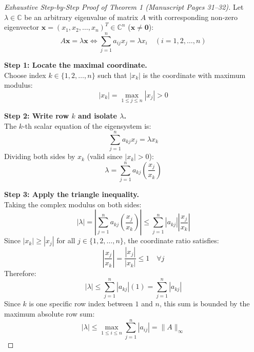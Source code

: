\begin{proof}[Exhaustive Step-by-Step Proof of Theorem 1 (Manuscript Pages 31--32)]
Let $\lambda \in \mathbb{C}$ be an arbitrary eigenvalue of matrix $A$ with corresponding non-zero eigenvector $\mathbf{x} = (x_1, x_2, \dots, x_n)^T \in \mathbb{C}^n$ ($\mathbf{x} \ne \mathbf{0}$):
\begin{equation}
    A \mathbf{x} = \lambda \mathbf{x} \iff \sum_{j=1}^n a_{ij} x_j = \lambda x_i \quad (i = 1, 2, \dots, n)
\end{equation}

\noindent\textbf{Step 1: Locate the maximal coordinate.} \\
Choose index $k \in \{1, 2, \dots, n\}$ such that $|x_k|$ is the coordinate with maximum modulus:
\begin{equation}
    |x_k| = \max_{1 \le j \le n} |x_j| > 0
\end{equation}

\noindent\textbf{Step 2: Write row $k$ and isolate $\lambda$.} \\
The $k$-th scalar equation of the eigensystem is:
\begin{equation}
    \sum_{j=1}^n a_{kj} x_j = \lambda x_k
\end{equation}
Dividing both sides by $x_k$ (valid since $|x_k| > 0$):
\begin{equation}
    \lambda = \sum_{j=1}^n a_{kj} \left( \frac{x_j}{x_k} \right)
\end{equation}

\noindent\textbf{Step 3: Apply the triangle inequality.} \\
Taking the complex modulus on both sides:
\begin{equation}
    |\lambda| = \left| \sum_{j=1}^n a_{kj} \left( \frac{x_j}{x_k} \right) \right| \le \sum_{j=1}^n |a_{kj}| \left| \frac{x_j}{x_k} \right|
\end{equation}
Since $|x_k| \ge |x_j|$ for all $j \in \{1, 2, \dots, n\}$, the coordinate ratio satisfies:
\begin{equation}
    \left| \frac{x_j}{x_k} \right| = \frac{|x_j|}{|x_k|} \le 1 \quad \forall j
\end{equation}
Therefore:
\begin{equation}
    |\lambda| \le \sum_{j=1}^n |a_{kj}| (1) = \sum_{j=1}^n |a_{kj}|
\end{equation}
Since $k$ is one specific row index between $1$ and $n$, this sum is bounded by the maximum absolute row sum:
\begin{equation}
    \label{eq:row_modulus_bound}
    |\lambda| \le \max_{1 \le i \le n} \sum_{j=1}^n |a_{ij}| = \|A\|_\infty
\end{equation}


\end{proof}
